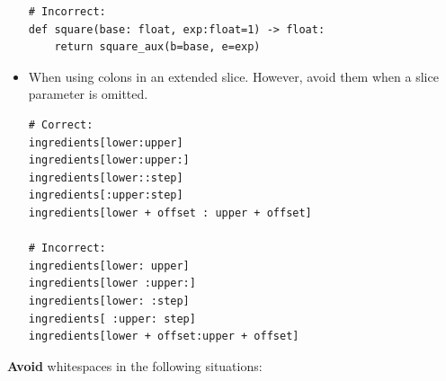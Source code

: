 \documentclass{tufte-handout}
\begin{document}
\begin{itemize}
\begin{mdframed}
\begin{verbatim}
# Incorrect:
def square(base: float, exp:float=1) -> float:
    return square_aux(b=base, e=exp)
\end{verbatim}
\end{mdframed}

	\item When using colons in an extended slice. However, avoid them when a slice parameter is omitted.
	
\begin{mdframed}
\begin{verbatim}
# Correct:
ingredients[lower:upper]
ingredients[lower:upper:]
ingredients[lower::step]
ingredients[:upper:step]
ingredients[lower + offset : upper + offset]

# Incorrect:
ingredients[lower: upper]
ingredients[lower :upper:]
ingredients[lower: :step]
ingredients[ :upper: step]
ingredients[lower + offset:upper + offset]
\end{verbatim}
\end{mdframed}
	
\end{itemize}
\textbf{Avoid} whitespaces in the following situations:
\end{document}
